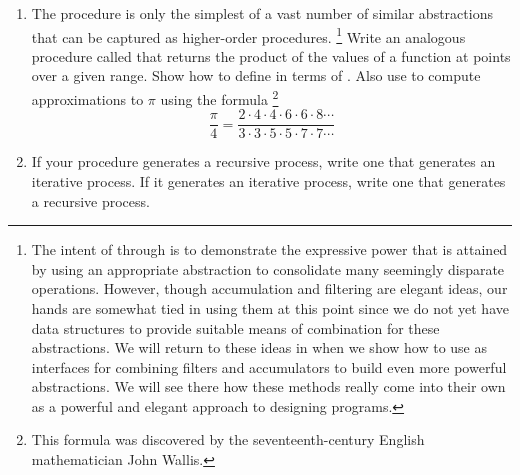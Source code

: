\begin{exercise}
	\label{Exercise 1.31}
	\begin{enumerate}[label = \alph*., leftmargin =  *]

		\item
			The  procedure is only the simplest of a vast number of similar abstractions that can be captured as higher-order procedures.%
			\footnote{
				The intent of  through  is to demonstrate the expressive power that is attained by using an appropriate abstraction to consolidate many seemingly disparate operations.
				However, though accumulation and filtering are elegant ideas, our hands are somewhat tied in using them at this point since we do not yet have data structures to provide suitable means of combination for these abstractions.
				We will return to these ideas in  when we show how to use  as interfaces for combining filters and accumulators to build even more powerful abstractions.
				We will see there how these methods really come into their own as a powerful and elegant approach to designing programs.
			}
			Write an analogous procedure called  that returns the product of the values of a function at points over a given range.
			Show how to define  in terms of .
			Also use  to compute approximations to \( π \) using the formula%
			\footnote{
				This formula was discovered by the seventeenth-century English mathematician John Wallis.
			}
			\[
				\frac{π}{4}
				=
				\frac{2 ⋅ 4 ⋅ 4 ⋅ 6 ⋅ 6 ⋅ 8 \dotsm}{3 ⋅ 3 ⋅ 5 ⋅ 5 ⋅ 7 ⋅ 7 \dotsm}
			\]

		\item
			If your  procedure generates a recursive process, write one that generates an iterative process.
			If it generates an iterative process, write one that generates a recursive process.

	\end{enumerate}
\end{exercise}



